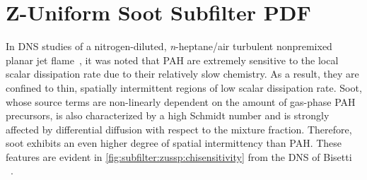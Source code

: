 \section{Z-Uniform Soot Subfilter PDF}
\label{sec:subfilter:zussp}


In DNS studies of a nitrogen-diluted, \textit{n}-heptane/air turbulent nonpremixed planar jet flame~\cite{bisetti2012,attili2014,attili2015}, it was noted that PAH are extremely sensitive to the local scalar dissipation rate due to their relatively slow chemistry. As a result, they are confined to thin, spatially intermittent regions of low scalar dissipation rate. Soot, whose source terms are non-linearly dependent on the amount of gas-phase PAH precursors, is also characterized by a high Schmidt number and is strongly affected by differential diffusion with respect to the mixture fraction. Therefore, soot exhibits an even higher degree of spatial intermittency than PAH. These features are evident in \cref{fig:subfilter:zussp:chisensitivity} from the DNS of Bisetti \etal~\cite{bisetti2012}.

